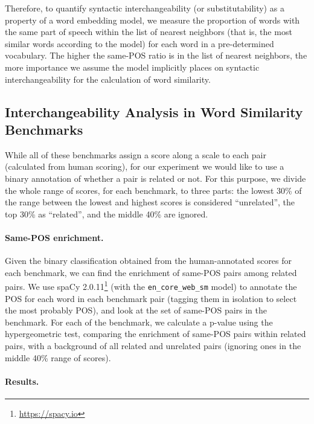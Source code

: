 \documentclass[11pt,a4paper]{article}
\begin{document}
    Therefore, to quantify syntactic interchangeability (or substitutability)
    as a property of a word embedding model,
    we measure the proportion of words with the same part of speech
    within the list of nearest neighbors
    (that is, the most similar words according to the model)
    for each word in a pre-determined vocabulary.
    The higher the same-POS ratio is in the list of nearest neighbors,
    the more importance we assume the model implicitly places on syntactic interchangeability
    for the calculation of word similarity.
    
    \subsection{Interchangeability Analysis in Word Similarity Benchmarks}\label{sec:benchmark_exp}
    
    While all of these benchmarks assign a score along a scale to each pair
    (calculated from human scoring), for our experiment we would like to use
    a binary annotation of whether a pair is related or not.
    For this purpose, we divide the whole range of scores,
    for each benchmark, to three parts:
    the lowest 30\% of the range between the lowest and highest scores
    is considered ``unrelated'', the top 30\% as ``related'',
    and the middle 40\% are ignored.
    
    \paragraph{Same-POS enrichment.}
    
    Given the binary classification obtained from the human-annotated scores
    for each benchmark, we can find the enrichment of same-POS pairs among
    related pairs.
    We use spaCy 2.0.11\footnote{\url{https://spacy.io}} (with the \texttt{en\_core\_web\_sm} model)
    to annotate the POS for each word in each benchmark
    pair (tagging them in isolation to select the most probably POS),
    and look at the set of same-POS pairs in the benchmark.
    For each of the benchmark, we calculate a p-value using the hypergeometric
    test, comparing the enrichment of same-POS pairs within related pairs,
    with a background of all related and unrelated pairs (ignoring ones in
    the middle 40\% range of scores).
    
    \paragraph{Results.}
    
\end{document}
